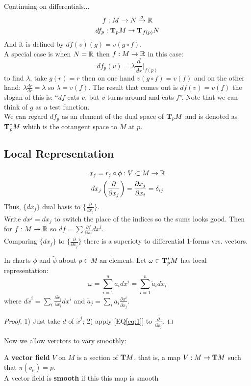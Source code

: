 Continuing on differentials...\\
\begin{gather*}
f: M\to N \xrightarrow{g} \mathbb{R}\\
df_p: \text{\textbf{T}}_pM \to \text{\textbf{T}}_{f(p)}N
\end{gather*}
And it is defined by $df(v)(g)=v(g\circ f)$.\\
A special case is when $N=\mathbb{R}$ then $f: M \to \mathbb{R}$ in this case: 
$$df_p(v)= \lambda \frac{d}{dr}\bigg|_{f(p)}$$
to find $\lambda$, take $g(r)=r$ then on one hand $v(g\circ f) = v(f)$ and on the other hand: $\lambda \frac{dr}{dr}= \lambda$ so $\lambda= v(f)$.  The result that comes out is $df(v)=v(f)$ the slogan of this is: ``$df$ eats $v$, but $v$ turns around and eats $f$''. Note that we can think of $g$ as a test function.\\
We can regard $df_p$ as an element of the dual space of $\text{\textbf{T}}_pM$ and is denoted as $\text{\textbf{T}}_p^*M$ which is the cotangent space to $M$ at $p$. 

\subsection{Local Representation}
\begin{gather*}
x_j=r_j\circ \phi : V\subset M \to \mathbb{R}\\
dx_j\left(\frac{\partial}{\partial x_j} \right) = \frac{\partial x_j}{\partial x_i}  = \delta_{ij}
\end{gather*}
Thus, $\{dx_j \}$ dual basis to $\{\frac{\partial}{\partial x_j} \}$.\\
Write $dx^j=dx_j$ to switch the place of the indices so the sums looks good. Then for $f: M\to \mathbb{R}$  so $df=\sum \frac{\partial f}{\partial x_j} dx^i$.\\
 Comparing $\{dx_j\}$ to $\{\frac{\partial}{\partial x_j} \}$ there is a superioty to differential 1-forms vrs. vectors.
\begin{teorema}
In charts $\phi$ and $\tilde \phi$ about $p\in M$ an  element. Let $\omega\in \text{\textbf{T}}_p^* M$ has local representation:
\begin{equation} \label{eq:1}
 \omega= \sum_{i=1}^n a_i dx^i = \sum_{i=1}^n \tilde a_i d\tilde x_i 
\end{equation}
where $d\tilde x^i = \sum_i \frac{\partial \tilde x_j}{\partial x_i} dx^i$ and $\tilde a_j = \sum_i a_i \frac{\partial x^i}{\partial \tilde x_j} $.
\begin{proof}
1) Just take $d$ of $\tilde x^j$; 2) apply [EQ\ref{eq:1}] to $\frac{\partial}{\partial \tilde x_j} $.
\end{proof}
\end{teorema}
Now we allow verctors to vary smoothly:
\begin{ddef}
A \textbf{vector field } $V$ on $M$ is a section of $\text{\textbf{T}} M$, that is, a map $V:M\to \text{\textbf{T}} M$ such that $\pi(v_p)=p$.\\
A vector field is \textbf{smooth} if this this map is smooth
\end{ddef}

